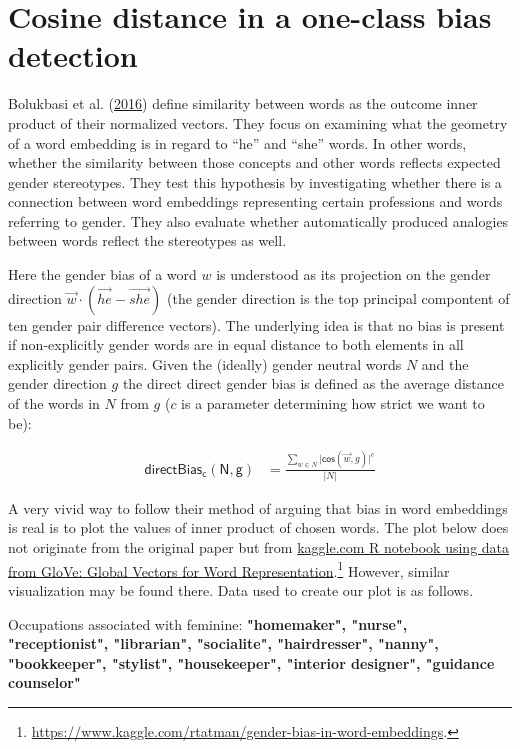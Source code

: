 \documentclass[12pt,]{book}
\begin{document}
\section{Cosine distance in a one-class bias
detection}\label{cosine-distance-in-a-one-class-bias-detection}

Bolukbasi et al. (\protect\hyperlink{ref-Bolukbasi2016Man}{2016}) define
similarity between words as the outcome inner product of their
normalized vectors. They focus on examining what the geometry of a word
embedding is in regard to ``he'' and ``she'' words. In other words,
whether the similarity between those concepts and other words reflects
expected gender stereotypes. They test this hypothesis by investigating
whether there is a connection between word embeddings representing
certain professions and words referring to gender. They also evaluate
whether automatically produced analogies between words reflect the
stereotypes as well.

Here the gender bias of a word \(w\) is understood as its projection on
the gender direction
\(\vec{w} \cdot (\overrightarrow{he} - \overrightarrow{she})\) (the
gender direction is the top principal compontent of ten gender pair
difference vectors). The underlying idea is that no bias is present if
non-explicitly gender words are in equal distance to both elements in
all explicitly gender pairs. Given the (ideally) gender neutral words
\(N\) and the gender direction \(g\) the direct direct gender bias is
defined as the average distance of the words in \(N\) from \(g\) (\(c\)
is a parameter determining how strict we want to be):

\begin{align}
\mathsf{directBias_c(N,g)} & = \frac{\sum_{w\in N}\vert \mathsf{cos}(\vec{w},g)\vert^c}{\vert N \vert }
\end{align}

A very vivid way to follow their method of arguing that bias in word
embeddings is real is to plot the values of inner product of chosen
words. The plot below does not originate from the original paper but
from
\href{https://www.kaggle.com/rtatman/gender-bias-in-word-embeddings}{kaggle.com
R notebook using data from GloVe: Global Vectors for Word
Representation}.\footnote{\url{https://www.kaggle.com/rtatman/gender-bias-in-word-embeddings}.}
However, similar visualization may be found there. Data used to create
our plot is as follows.

Occupations associated with feminine:
\textbf{"homemaker", "nurse", "receptionist", "librarian", "socialite", "hairdresser", "nanny", "bookkeeper", "stylist", "housekeeper", "interior designer", "guidance counselor"}
\end{document}
